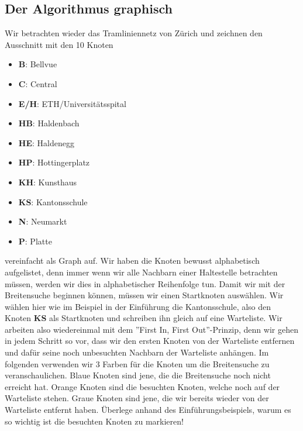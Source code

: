 \subsection{Der Algorithmus graphisch}
Wir betrachten wieder das Tramliniennetz von Zürich und zeichnen den Ausschnitt mit den 10 Knoten
\begin{multicols}{2}
\begin{itemize}
    \item {\bf{B}}: Bellvue
    \item {\bf{C}}: Central
    \item {\bf{E/H}}: ETH/Universitätsspital
    \item {\bf{HB}}: Haldenbach
    \item {\bf{HE}}: Haldenegg
    \item {\bf{HP}}: Hottingerplatz
    \item {\bf{KH}}: Kunsthaus
    \item {\bf{KS}}: Kantonsschule
    \item {\bf{N}}: Neumarkt
    \item {\bf{P}}: Platte

\end{itemize}
\end{multicols}
\noindent vereinfacht als Graph auf. Wir haben die Knoten bewusst alphabetisch aufgelistet, denn immer wenn wir alle Nachbarn einer Haltestelle betrachten müssen, werden wir dies in alphabetischer Reihenfolge tun. 
Damit wir mit der Breitensuche beginnen können, müssen wir einen Startknoten auswählen. Wir wählen hier wie im Beispiel in der Einführung die Kantonsschule, also den Knoten {\bf{KS}} als Startknoten und schreiben ihn gleich auf eine Warteliste. Wir arbeiten also wiedereinmal mit dem ''First In, First Out''-Prinzip, denn wir gehen in jedem Schritt so vor, dass wir den ersten Knoten von der Warteliste entfernen und dafür seine noch unbesuchten Nachbarn der Warteliste anhängen. Im folgenden verwenden wir 3 Farben für die Knoten um die Breitensuche zu veranschaulichen. Blaue Knoten sind jene, die die Breitensuche noch nicht erreicht hat. Orange Knoten sind die besuchten Knoten, welche noch auf der Warteliste stehen. Graue Knoten sind jene, die wir bereits wieder von der Warteliste entfernt haben. Überlege anhand des Einführungsbeispiels, warum es so wichtig ist die besuchten Knoten zu markieren!

